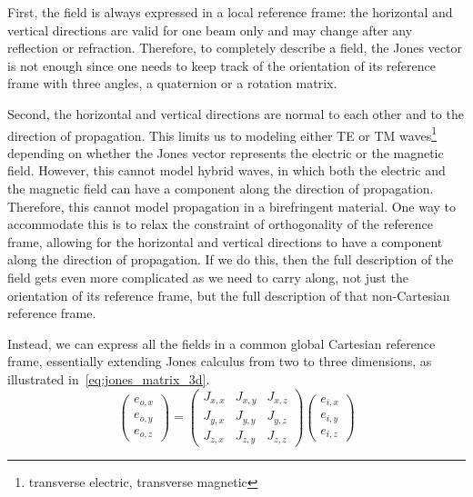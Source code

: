 \documentclass[journal]{IEEEtran}
\begin{document}
First, the field is always expressed in a local reference frame: the horizontal and vertical directions are valid for one beam only and may change after any reflection or refraction.
Therefore, to completely describe a field, the Jones vector is not enough since one needs to keep track of the orientation of its reference frame with three angles, a quaternion or a rotation matrix.

Second, the horizontal and vertical directions are normal to each other and to the direction of propagation.
This limits us to modeling either TE or TM waves\footnote{transverse electric, transverse magnetic} depending on whether the Jones vector represents the electric or the magnetic field.
However, this cannot model hybrid waves, in which both the electric and the magnetic field can have a component along the direction of propagation.
Therefore, this cannot model propagation in a birefringent material.
One way to accommodate this is to relax the constraint of orthogonality of the reference frame, allowing for the horizontal and vertical directions to have a component along the direction of propagation.
If we do this, then the full description of the field gets even more complicated as we need to carry along, not just the orientation of its reference frame, but the full description of that non-Cartesian reference frame.

Instead, we can express all the fields in a common global Cartesian reference frame, essentially extending Jones calculus from two to three dimensions, as illustrated in~\eqref{eq:jones_matrix_3d}.
\begin{equation}
    \begin{pmatrix}
        e_{o, x}\\
        e_{o, y}\\
        e_{o, z}
    \end{pmatrix}
    =
    \begin{pmatrix}
        J_{x, x}   &   J_{x, y}   &   J_{x, z} \\
        J_{y, x}   &   J_{y, y}   &   J_{y, z} \\
        J_{z, x}   &   J_{z, y}   &   J_{z, z}
    \end{pmatrix}
    \begin{pmatrix}
        e_{i, x}\\
        e_{i, y}\\
        e_{i, z}
    \end{pmatrix}
    \label{eq:jones_matrix_3d}
\end{equation}
\end{document}
